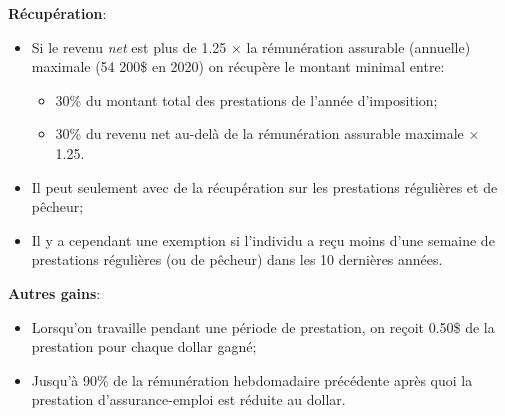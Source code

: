 \documentclass[10pt, french]{article}
\begin{document}
\begin{multicols*}{3}
\begin{definitionNOHFILLsub}[Fiscalité]
\textbf{Récupération}:
\begin{itemize}[leftmargin = *]
	\item	Si le revenu \textit{net} est plus de 1.25 $\times$ la rémunération assurable (annuelle) maximale (54 200\$ en 2020) on récupère le montant minimal entre:
	\begin{itemize}[leftmargin = *]
	\item	30\% du montant total des prestations de l'année d'imposition;
	\item	30\% du revenu net au-delà de la rémunération assurable maximale $\times$ 1.25.
	\end{itemize}
	\item	Il peut seulement avec de la récupération sur les prestations régulières et de pêcheur;
	\item	Il y a cependant une exemption si l'individu a reçu moins d'une semaine de prestations régulières (ou de pêcheur) dans les 10 dernières années.
\end{itemize}

\textbf{Autres gains}:
\begin{itemize}[leftmargin = *]
	\item	Lorsqu'on travaille pendant une période de prestation, on reçoit 0.50\$ de la prestation pour chaque dollar gagné;
	\item	Jusqu'à 90\% de la rémunération hebdomadaire précédente après quoi la prestation d'assurance-emploi est réduite au dollar.
\end{itemize}
\end{definitionNOHFILLsub}


\end{multicols*}
\end{document}
